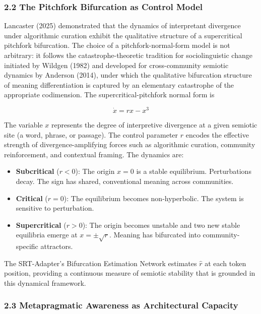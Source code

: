 \documentclass[
  11pt]{article}
\providecommand{\tightlist}{%
  \setlength{\itemsep}{0pt}\setlength{\parskip}{0pt}}
\begin{document}
\subsubsection{2.2 The Pitchfork Bifurcation as Control
Model}\label{the-pitchfork-bifurcation-as-control-model}

Lancaster (2025) demonstrated that the dynamics of interpretant
divergence under algorithmic curation exhibit the qualitative structure
of a supercritical pitchfork bifurcation. The choice of a
pitchfork-normal-form model is not arbitrary: it follows the
catastrophe-theoretic tradition for sociolinguistic change initiated by
Wildgen (1982) and developed for cross-community semiotic dynamics by
Anderson (2014), under which the qualitative bifurcation structure of
meaning differentiation is captured by an elementary catastrophe of the
appropriate codimension. The supercritical-pitchfork normal form is

\[\dot{x} = rx - x^3\]

The variable \(x\) represents the degree of interpretive divergence at a
given semiotic site (a word, phrase, or passage). The control parameter
\(r\) encodes the effective strength of divergence-amplifying forces
such as algorithmic curation, community reinforcement, and contextual
framing. The dynamics are:

\begin{itemize}
\tightlist
\item
  \textbf{Subcritical} (\(r < 0\)): The origin \(x = 0\) is a stable
  equilibrium. Perturbations decay. The sign has shared, conventional
  meaning across communities.
\item
  \textbf{Critical} (\(r = 0\)): The equilibrium becomes non-hyperbolic.
  The system is sensitive to perturbation.
\item
  \textbf{Supercritical} (\(r > 0\)): The origin becomes unstable and
  two new stable equilibria emerge at \(x = \pm\sqrt{r}\). Meaning has
  bifurcated into community-specific attractors.
\end{itemize}

The SRT-Adapter's Bifurcation Estimation Network estimates \(\hat{r}\)
at each token position, providing a continuous measure of semiotic
stability that is grounded in this dynamical framework.

\subsubsection{2.3 Metapragmatic Awareness as Architectural
Capacity}\label{metapragmatic-awareness-as-architectural-capacity}
\end{document}
